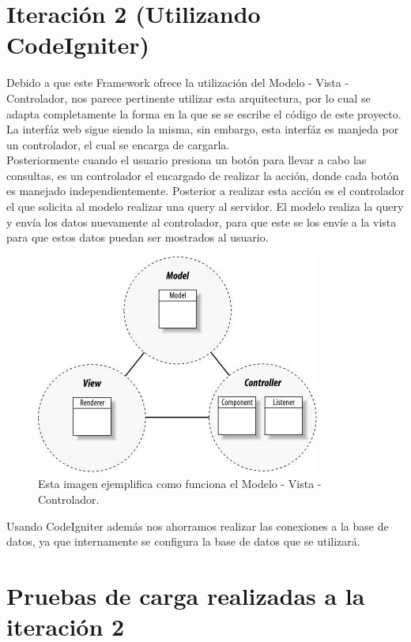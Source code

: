 \section{Iteración 2 (Utilizando CodeIgniter)}

Debido a que este Framework ofrece la utilización del Modelo - Vista - Controlador, nos parece pertinente utilizar esta arquitectura, por lo cual se adapta completamente la forma en la que se se escribe el código de este proyecto. \\

La interfáz web sigue siendo la misma, sin embargo, esta interfáz es manjeda por un controlador, el cual se encarga de cargarla.\\

Posteriormente cuando el usuario presiona un botón para llevar a cabo las consultas, es un controlador el encargado de realizar la acción, donde cada botón es manejado independientemente. Posterior a realizar esta acción es el controlador el que solicita al modelo realizar una query al servidor. El modelo realiza la query y envía los datos nuevamente al controlador, para que este se los envíe a la vista para que estos datos puedan ser mostrados al usuario. 

 \begin{figure}[htb]
 	\label{Figura9}
 	\begin{center}
 		\includegraphics[scale=0.5]{imagenes/mvc.JPG}
 		\caption{Esta imagen ejemplifica como funciona el Modelo - Vista - Controlador.}
 	\end{center}
 \end{figure}
 
 Usando CodeIgniter además nos ahorramos realizar las conexiones a la base de datos, ya que internamente se configura la base de datos que se utilizará. 
 
 \section{Pruebas de carga realizadas a la iteración 2}
 
